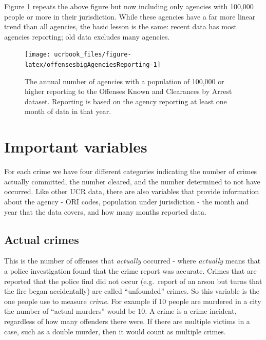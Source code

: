 \documentclass[
  12pt,
  openany]{book}
\begin{document}
Figure \ref{fig:offensesbigAgenciesReporting} repeats the above figure but now including only agencies with 100,000 people or more in their jurisdiction. While these agencies have a far more linear trend than all agencies, the basic lesson is the same: recent data has most agencies reporting; old data excludes many agencies.

\begin{figure}

{\centering \texttt{[image: ucrbook\_files/figure-latex/offensesbigAgenciesReporting-1]} 

}

\caption{The annual number of agencies with a population of 100,000 or higher reporting to the Offenses Known and Clearances by Arrest dataset. Reporting is based on the agency reporting at least one month of data in that year.}\label{fig:offensesbigAgenciesReporting}
\end{figure}

\hypertarget{important-variables}{%
\section{Important variables}\label{important-variables}}

For each crime we have four different categories indicating the number of crimes actually committed, the number cleared, and the number determined to not have occurred. Like other UCR data, there are also variables that provide information about the agency - ORI codes, population under jurisdiction - the month and year that the data covers, and how many months reported data.

\hypertarget{actual}{%
\subsection{Actual crimes}\label{actual}}

This is the number of offenses that \emph{actually} occurred - where \emph{actually} means that a police investigation found that the crime report was accurate. Crimes that are reported that the police find did not occur (e.g.~report of an arson but turns that the fire began accidentally) are called ``unfounded'' crimes. So this variable is the one people use to measure \emph{crime}. For example if 10 people are murdered in a city the number of ``actual murders'' would be 10. A crime is a crime incident, regardless of how many offenders there were. If there are multiple victims in a case, such as a double murder, then it would count as multiple crimes.
\end{document}
